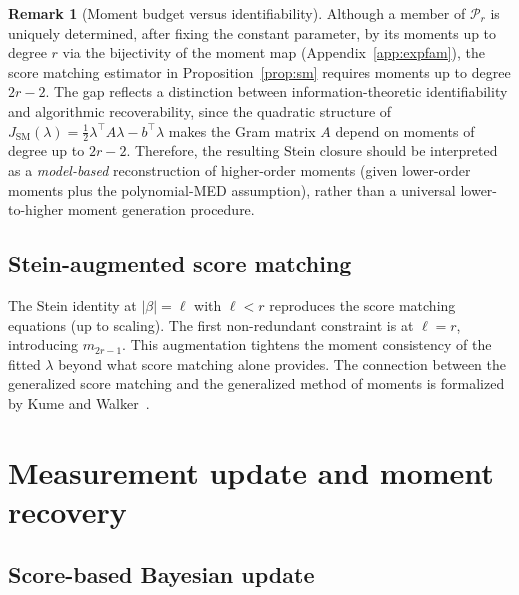 \documentclass{article}
\theoremstyle{definition}
\newtheorem{remark}{Remark}
\begin{document}
\begin{remark}[Moment budget versus identifiability]\label{rem:moment-budget}
Although a member of $\mathcal{P}_r$ is uniquely determined, after fixing
the constant parameter, by its moments up to degree $r$ via the
bijectivity of the moment map (Appendix~\ref{app:expfam}),
the score matching estimator in Proposition~\ref{prop:sm} requires moments up to
degree $2r{-}2$. The gap reflects a distinction between information-theoretic
identifiability and algorithmic recoverability, since the quadratic structure of
$J_{\mathrm{SM}}(\lambda) = \frac{1}{2}\lambda^\top A \lambda - b^\top \lambda$
makes the Gram matrix $A$ depend on moments of degree up to $2r{-}2$. Therefore, the
resulting Stein closure should be interpreted as a \emph{model-based}
reconstruction of higher-order moments (given lower-order moments plus the
polynomial-MED assumption), rather than a universal lower-to-higher moment
generation procedure.
\end{remark}

\subsection{Stein-augmented score matching}

The Stein identity at $|\beta| = \ell$ with $\ell < r$ reproduces the
score matching equations (up to scaling). The first non-redundant constraint
is at $\ell = r$, introducing $m_{2r-1}$.
This augmentation tightens the moment consistency of the fitted $\lambda$
beyond what score matching alone provides.
The connection between the generalized score matching and the generalized method of moments is formalized
by Kume and Walker~\cite{kume2026}.

\section{Measurement update and moment recovery}
\label{sec:update}

\subsection{Score-based Bayesian update}
\end{document}
